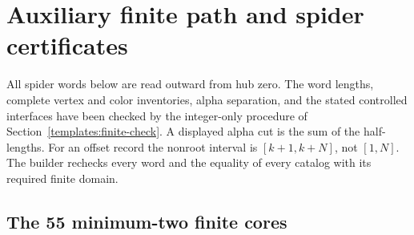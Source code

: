 \section{Auxiliary finite path and spider certificates}
\label{app:auxiliary-finite}
All spider words below are read outward from hub zero. The word lengths, complete vertex and color inventories, alpha separation, and the stated controlled interfaces have been checked by the integer-only procedure of Section~\ref{templates:finite-check}. A displayed alpha cut is the sum of the half-lengths. For an offset record the nonroot interval is $[k+1,k+N]$, not $[1,N]$. The builder  rechecks every word and the equality of every catalog with its required finite domain.
\subsection{The 55 minimum-two finite cores}
\label{aux:min2}
\begingroup\footnotesize
